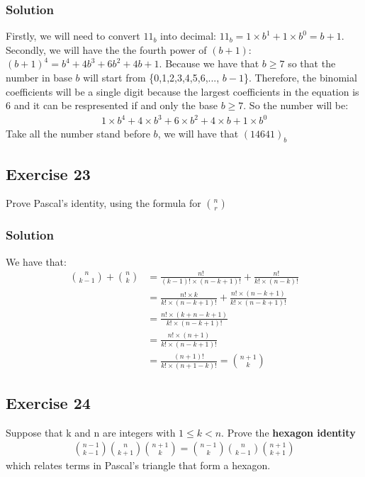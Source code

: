 \documentclass{article}
\theoremstyle{mytheoremstyle}
\theoremstyle{mytheoremstyle}
\theoremstyle{myproblemstyle}
\begin{document}
    \subsubsection*{Solution}
    Firstly, we will need to convert \(11_b\) into decimal: \(11_b = 1 \times b^1 + 1 \times b^ 0 = b + 1\). Secondly, we will have
    the the fourth power of \((b + 1)\): \((b + 1)^4 = b^4 + 4b^3 + 6b^2 + 4b + 1\). Because we have that \(b \geq 7\) so that the number in base \(b\)
    will start from \{0,1,2,3,4,5,6,..., \(b-1\)\}. Therefore, the binomial coefficients will be a single digit because the largest coefficients in the
    equation is 6 and it can be respresented if and only the base \(b \geq 7\). So the number will be:
    \begin{align*}
        1 \times b^4 + 4 \times b^3 + 6 \times b^2 + 4 \times b + 1 \times b^0
    \end{align*} 
    Take all the number stand before \(b\), we will have that \((14641)_b\)
    \subsection*{Exercise 23}
    Prove Pascal’s identity, using the formula for \(\binom{n}{r}\)
    \subsubsection*{Solution}
    We have that:
    \begin{align*}
        \binom{n}{k - 1} + \binom{n}{k} &= \frac{n!}{(k - 1)! \times (n - k + 1)!} + \frac{n!}{k! \times (n - k)!}\\ 
        &= \frac{n! \times k}{k! \times (n - k + 1)!} + \frac{n! \times (n - k + 1)}{k! \times (n - k + 1)!}\\ 
        &= \frac{n! \times (k + n - k + 1)}{k! \times (n - k + 1)!}\\ 
        &= \frac{n! \times (n + 1)}{k! \times (n - k + 1)!} \\
        &= \frac{(n + 1)!}{k! \times (n + 1 - k)!} = \binom{n + 1}{k}
    \end{align*}
    \subsection*{Exercise 24}
    Suppose that k and n are integers with \(1 \leq k < n\). Prove the \textbf{hexagon identity}
    \begin{align*}
        \binom{n - 1}{k - 1}\binom{n}{k+1}\binom{n+1}{k} = \binom{n - 1}{k}\binom{n}{k - 1}\binom{n + 1}{k + 1}
    \end{align*}
    which relates terms in Pascal's triangle that form a hexagon.
\end{document}
